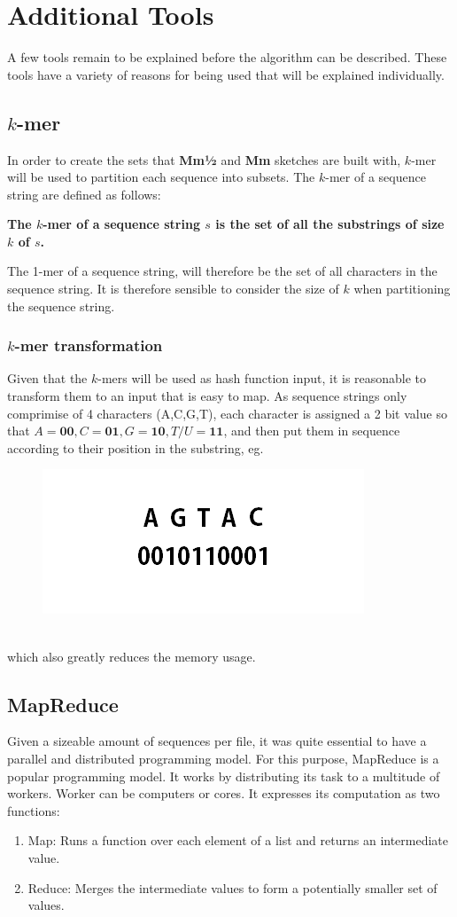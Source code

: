 \documentclass[../../main.tex]{subfiles}
\begin{document}
\section{Additional Tools}
A few tools remain to be explained before the algorithm can be described. These tools have a variety of reasons for being used that will be explained individually. 
\subsection{$k$-mer}
In order to create the sets that {\bf Mm½} and {\bf Mm} sketches are built with, $k$-mer will be used to partition each sequence into subsets. The $k$-mer of a sequence string are defined as follows:
\begin{center}
{\bf The $k$-mer of a sequence string $s$ is the set of all the substrings of size $k$ of $s$.}
\end{center}
The 1-mer of a sequence string, will therefore be the set of all characters in the sequence string. It is therefore sensible to consider the size of $k$ when partitioning the sequence string.
\subsubsection{$k$-mer transformation}
Given that the $k$-mers will be used as hash function input, it is reasonable to transform them to an input that is easy to map. As sequence strings only comprimise of 4 characters (A,C,G,T), each character is assigned a 2 bit value so that $A=\mathbf{00},C=\mathbf{01},G=\mathbf{10},T/U=\mathbf{11}$, and then put them in sequence according to their position in the substring, eg.
\begin{figure}[h]
\includegraphics[scale=0.4]{fig/kmertransformed}
\end{figure}\\
which also greatly reduces the memory usage.
\subsection{MapReduce}
Given a sizeable amount of sequences per file, it was quite essential to have a parallel and distributed programming model. For this purpose, MapReduce is a popular programming model. It works by distributing its task to a multitude of workers. Worker can be computers or cores. It expresses its computation as two functions:
\begin{enumerate}
\item Map: Runs a function over each element of a list and returns an intermediate value.
\item Reduce: Merges the intermediate values to form a potentially smaller set of values.
\end{enumerate}
\end{document}
